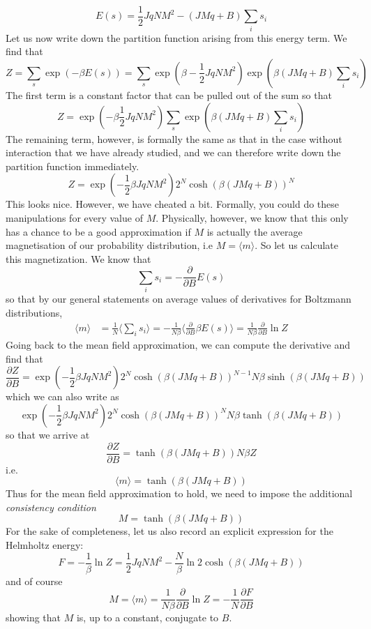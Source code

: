 \documentclass[a4paper, draft]{article}
\theoremstyle{own}
\theoremstyle{remark}
\begin{document}
$$
E(s) = \frac{1}{2} J q N M^2  - (J M q + B) \sum_i s_i
$$
Let us now write down the partition function arising from this energy term. We find that
$$
Z = \sum_s \exp(- \beta E(s)) = \sum_s \exp(\beta -\frac{1}{2} J q N M^2) \exp( \beta (J M q + B) \sum_i s_i)
$$
The first term is a constant factor that can be pulled out of the sum so that
$$
Z = \exp( -\beta \frac{1}{2} J q N M^2) \sum_s  \exp( \beta (J M q + B) \sum_i s_i)
$$
The remaining term, however, is formally the same as that in the case without interaction that we have already studied, and we can therefore write down the partition function immediately.
$$
Z = \exp( - \frac{1}{2} \beta J q N M^2) 2^N \cosh(\beta (J M q + B))^N
$$
This looks nice. However, we have cheated a bit. Formally, you could do these manipulations for every value of $M$. Physically, however, we know that this only has a chance to be a good approximation if $M$ is actually the average magnetisation of our probability distribution, i.e $M = \langle m \rangle$. So let us calculate this magnetization. We know that
$$
\sum_i s_i = - \frac{\partial}{\partial B} E(s)
$$
so that by our general statements on average values of derivatives for Boltzmann distributions,
\begin{align*}
\langle m \rangle &= \frac{1}{N} \langle \sum_i s_i \rangle  = - \frac{1}{N\beta} \langle \frac{\partial}{\partial B} \beta E(s)  \rangle  
= \frac{1}{N \beta} \frac{\partial}{\partial B} \ln Z
\end{align*}
Going back to the mean field approximation, we can compute the derivative and find that
$$
\frac{\partial Z}{\partial B} = \exp( - \frac{1}{2} \beta J q N M^2) 2^N \cosh (\beta (J M q + B))^{N-1} N \beta  \sinh (\beta (J M q + B))
$$
which we can also write as
$$
\exp( - \frac{1}{2} \beta J q N M^2) 2^N \cosh (\beta (J M q + B))^N  N \beta \tanh (\beta (J M q + B))
$$
so that we arrive at
$$
\frac{\partial Z}{\partial B} = \tanh (\beta (J M q + B)) N \beta Z
$$
i.e.
$$
\langle m \rangle = \tanh (\beta (J M q + B)) 
$$
Thus for the mean field approximation to hold, we need to impose the additional {\em consistency condition}
$$
M = \tanh (\beta (J M q + B)) 
$$
For the sake of completeness, let us also record an explicit expression for the Helmholtz energy:
$$
F = -\frac{1}{\beta} \ln Z =  \frac{1}{2} J q N M^2 - \frac{N}{\beta} \ln  2 \cosh(\beta (J M q + B))
$$
and of course
$$
M = \langle m \rangle = \frac{1}{N \beta} \frac{\partial}{\partial B} \ln Z = - \frac{1}{N} \frac{\partial F}{\partial B}
$$
showing that $M$ is, up to a constant, conjugate to $B$. 
\end{document}
